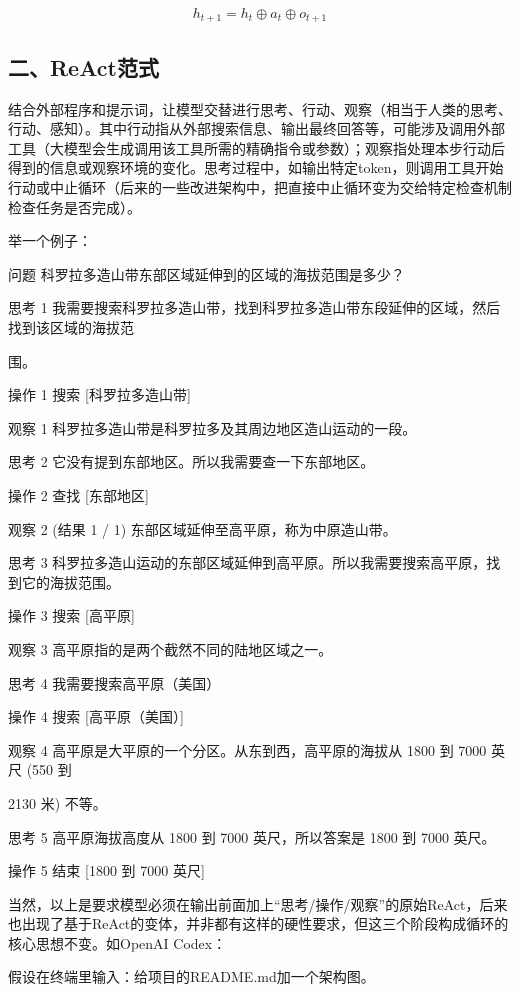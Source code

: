 \[
h_{t+1}=h_t \oplus a_t \oplus o_{t+1}
\]

\hypertarget{ux4e8creactux8303ux5f0f}{%
\subsection{二、ReAct范式}\label{ux4e8creactux8303ux5f0f}}

结合外部程序和提示词，让模型交替进行思考、行动、观察（相当于人类的思考、行动、感知）。其中行动指从外部搜索信息、输出最终回答等，可能涉及调用外部工具（大模型会生成调用该工具所需的精确指令或参数）；观察指处理本步行动后得到的信息或观察环境的变化。思考过程中，如输出特定token，则调用工具开始行动或中止循环（后来的一些改进架构中，把直接中止循环变为交给特定检查机制检查任务是否完成）。

举一个例子：

问题 科罗拉多造山带东部区域延伸到的区域的海拔范围是多少？

思考 1 我需要搜索科罗拉多造山带，找到科罗拉多造山带东段延伸的区域，然后找到该区域的海拔范

围。

操作 1 搜索 {[}科罗拉多造山带{]}

观察 1 科罗拉多造山带是科罗拉多及其周边地区造山运动的一段。

思考 2 它没有提到东部地区。所以我需要查一下东部地区。

操作 2 查找 {[}东部地区{]}

观察 2 (结果 1 / 1) 东部区域延伸至高平原，称为中原造山带。

思考 3 科罗拉多造山运动的东部区域延伸到高平原。所以我需要搜索高平原，找到它的海拔范围。

操作 3 搜索 {[}高平原{]}

观察 3 高平原指的是两个截然不同的陆地区域之一。

思考 4 我需要搜索高平原（美国）

操作 4 搜索 {[}高平原（美国）{]}

观察 4 高平原是大平原的一个分区。从东到西，高平原的海拔从 1800 到 7000 英尺 (550 到

2130 米) 不等。

思考 5 高平原海拔高度从 1800 到 7000 英尺，所以答案是 1800 到 7000 英尺。

操作 5 结束 {[}1800 到 7000 英尺{]}

当然，以上是要求模型必须在输出前面加上``思考/操作/观察''的原始ReAct，后来也出现了基于ReAct的变体，并非都有这样的硬性要求，但这三个阶段构成循环的核心思想不变。如OpenAI Codex：

假设在终端里输入：给项目的README.md加一个架构图。

